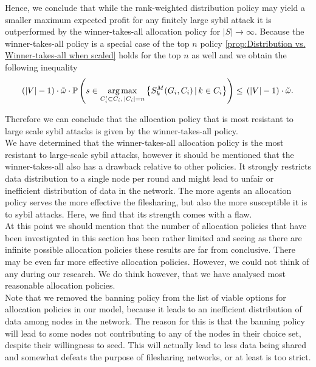 \noindent{}Hence, we conclude that while the rank-weighted distribution policy may yield a smaller maximum expected profit for any finitely large sybil attack it is outperformed by the winner-takes-all allocation policy for $|S|\rightarrow\infty$. Because the winner-takes-all policy is a special case of the top $n$ policy \ref{prop:Distribution vs. Winner-takes-all when scaled} holds for the top $n$ as well and we obtain the following inequality
\[
\left(|V|-1\right)\cdot\tilde{\omega}\cdot\mathbb{P}\left(s\in\operatorname*{arg\,max}\limits_{C_i'\subset{}C_i,\,|C_i|=n}\left\lbrace{}S_k^M(G_i,C_i)\,|\,k\in{}C_i\right\rbrace\right) \leq{} \left(|V|-1\right)\cdot\tilde{\omega}.
\]

\noindent{}Therefore we can conclude that the allocation policy that is most resistant to large scale sybil attacks is given by the winner-takes-all policy.\vspace{1em}\\

\noindent{}We have determined that the winner-takes-all allocation policy is the most resistant to large-scale sybil attacks, however it should be mentioned that the winner-takes-all also has a drawback relative to other policies. It strongly restricts data distribution to a single node per round and might lead to unfair or inefficient distribution of data in the network. The more agents an allocation policy serves the more effective the filesharing, but also the more susceptible it is to sybil attacks. Here, we find that its strength comes with a flaw. \vspace{1em}\\

\noindent{}At this point we should mention that the number of allocation policies that have been investigated in this section has been rather limited and seeing as there are infinite possible allocation policies these results are far from conclusive. There may be even far more effective allocation policies. However, we could not think of any during our research. We do think however, that we have analysed most reasonable allocation policies.\vspace{1em}\\

\noindent{}Note that we removed the banning policy from the list of viable options for allocation policies in our model, because it leads to an inefficient distribution of data among nodes in the network. The reason for this is that the banning policy will lead to some nodes not contributing to any of the nodes in their choice set, despite their willingness to seed. This will actually lead to less data being shared and somewhat defeats the purpose of filesharing networks, or at least is too strict. \vspace{1em}\\

